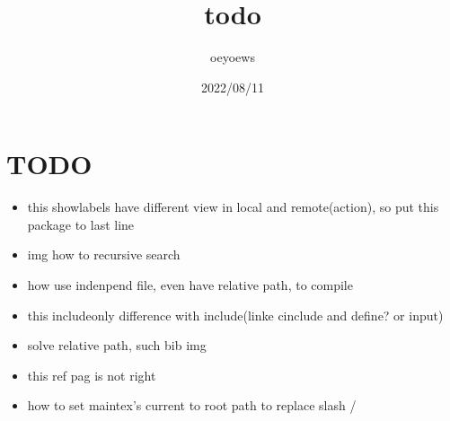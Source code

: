 \documentclass[UTF8]{article}
\title{todo \emoji{check-mark-button}}
\author{oeyoews}
\date{2022/08/11}
\begin{document}
\maketitle

\section{TODO }%
\label{sec:TODO}

\begin{itemize}
	\item this showlabels have different view in local and remote(action), so put
    this package to last line
	\item img how to recursive search
	\item how use indenpend file, even have relative path, to compile
	\item this includeonly difference with include(linke cinclude and define? or
	      input)
	\item solve relative path, such bib img
	\item this ref pag is not right
  \item how to set maintex's current to root path to replace slash /
\end{itemize}
\end{document}

